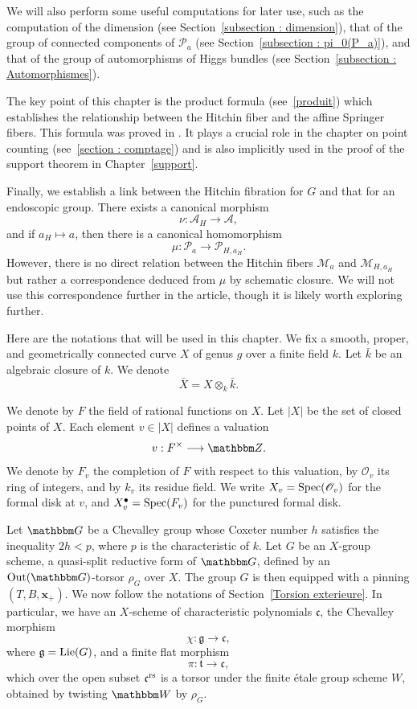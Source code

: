 \documentclass[12pt,english]{smfart}
\numberwithin{equation}{subsection}
\theoremstyle{remark}
\newcommand\calA{{\mathscr A}}
\newcommand\calP{{\mathscr P}}
\newcommand\calM{{\mathscr M}}
\newcommand\calO{{\mathscr O}}
\newcommand\frakg{{\mathfrak g}}
\newcommand\frakt{{\mathfrak t}}
\newcommand\frakc{{\mathfrak c}}
\newcommand\bfx{{\mathbf x}}
\newcommand\GG{{\mathbbm G}}
\newcommand\ZZ{{\mathbbm Z}}
\newcommand\bbW{{\mathbbm W}}
\newcommand\bbG{{\mathbbm G}}
\newcommand\Spec{{\rm Spec}}
\newcommand\Lie{{\rm Lie}}
\newcommand\Out{{\rm Out}}
\newcommand\rs{{\rm rs}}
\begin{document}
We will also perform some useful computations for later use, such as the computation of the dimension (see Section~\ref{subsection : dimension}), that of the group of connected components of $\calP_a$ (see Section~\ref{subsection : pi_0(P_a)}), and that of the group of automorphisms of Higgs bundles (see Section~\ref{subsection : Automorphismes}).

The key point of this chapter is the product formula (see~\ref{produit}) which establishes the relationship between the Hitchin fiber and the affine Springer fibers. This formula was proved in \cite{N}. It plays a crucial role in the chapter on point counting (see~\ref{section : comptage}) and is also implicitly used in the proof of the support theorem in Chapter~\ref{support}.

Finally, we establish a link between the Hitchin fibration for $G$ and that for an endoscopic group. There exists a canonical morphism
$$\nu:\calA_H\longrightarrow \calA,$$
and if $a_H\mapsto a$, then there is a canonical homomorphism
$$\mu:\calP_a \longrightarrow \calP_{H,a_H}.$$
However, there is no direct relation between the Hitchin fibers $\calM_a$ and $\calM_{H,a_H}$ but rather a correspondence deduced from $\mu$ by schematic closure. We will not use this correspondence further in the article, though it is likely worth exploring further.

\medskip

Here are the notations that will be used in this chapter. We fix a smooth, proper, and geometrically connected curve $X$ of genus $g$ over a finite field $k$. Let $\bar{k}$ be an algebraic closure of $k$. We denote
$$\bar{X}=X\otimes_k\bar{k}.$$

We denote by $F$ the field of rational functions on $X$. Let $|X|$ be the set of closed points of $X$. Each element $v\in |X|$ defines a valuation
$$v:F^\times\longrightarrow \ZZ.$$ 
We denote by $F_v$ the completion of $F$ with respect to this valuation, by $\calO_v$ its ring of integers, and by $k_v$ its residue field. We write $X_v=\Spec(\calO_v)$ for the formal disk at $v$, and $X_v^\bullet=\Spec(F_v)$ for the punctured formal disk.

Let $\bbG$ be a Chevalley group whose Coxeter number $h$ satisfies the inequality $2h<p$, where $p$ is the characteristic of $k$. Let $G$ be an $X$-group scheme, a quasi-split reductive form of $\GG$, defined by an $\Out(\GG)$-torsor $\rho_G$ over $X$. The group $G$ is then equipped with a pinning $(T,B,\bfx_+)$. We now follow the notations of Section~\ref{Torsion exterieure}. In particular, we have an $X$-scheme of characteristic polynomials $\frakc$, the Chevalley morphism
$$\chi:\frakg\longrightarrow \frakc,$$
where $\frakg=\Lie(G)$, and a finite flat morphism
$$\pi:\frakt\longrightarrow \frakc,$$
which over the open subset $\frakc^\rs$ is a torsor under the finite \'{e}tale group scheme $W$, obtained by twisting $\bbW$ by $\rho_G$.
\end{document}
